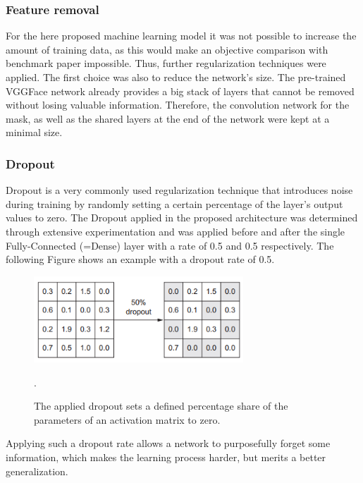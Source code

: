 \subsubsection{Feature removal}
For the here proposed machine learning model it was not possible to increase the amount of training data, as this would make an objective comparison with benchmark paper impossible. Thus, further regularization techniques were applied. The first choice was also to reduce the network's size. The pre-trained VGGFace network already provides a big stack of layers that cannot be removed without losing valuable information. Therefore, the convolution network for the mask, as well as the shared layers at the end of the network were kept at a minimal size.

\subsubsection{Dropout}
Dropout is a very commonly used regularization technique that introduces noise during training by randomly setting a certain percentage of the layer's output values to zero. The Dropout applied in the proposed architecture was determined through extensive experimentation and was applied before and after the single Fully-Connected (=Dense) layer with a rate of 0.5 and 0.5 respectively. The following Figure shows an example with a dropout rate of 0.5.

\begin{figure}[H]
  \begin{center}
  \includegraphics[angle=0, width=0.7\textwidth]{Figures/dropout.PNG}
  \caption[Dropout regularization]{The applied dropout sets a defined percentage share of the parameters of an activation matrix to zero.\citep{Chollet:2017:DeepLearningPython}}.
  \label{fig:Dropout}
  \end{center}
\end{figure}

Applying such a dropout rate allows a network to purposefully forget some information, which makes the learning process harder, but merits a better generalization.

